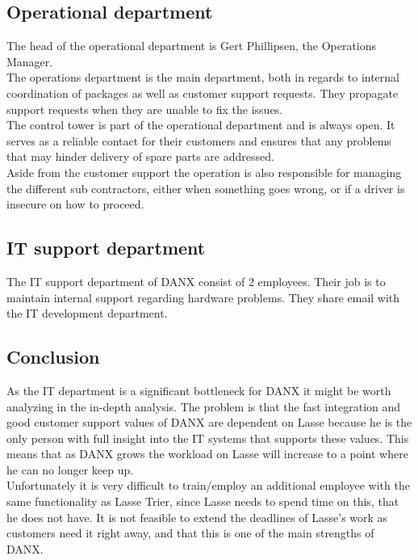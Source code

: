 \subsection{Operational department}
The head of the operational department is Gert Phillipsen, the Operations Manager.\\
The operations department is the main department, both in regards to internal coordination of packages as well as customer support requests.\cite{gert004} They propagate support requests when they are unable to fix the issues.\cite{lasse017}\\
The control tower is part of the operational department and is always open. It serves as a reliable contact for their customers and ensures that any problems that may hinder delivery of spare parts are addressed.\cite{gert004}\\
Aside from the customer support the operation is also responsible for managing the different sub contractors, either when something goes wrong, or if a driver is insecure on how to proceed.

\subsection{IT support department}
The IT support department of DANX consist of 2 employees. Their job is to maintain internal support regarding hardware problems. They share email with the IT development department.\cite{lasse003}

\subsection{Conclusion}
As the IT department is a significant bottleneck for DANX it might be worth analyzing in the in-depth analysis. The problem is that the fast integration and good customer support values of DANX are dependent on Lasse because he is the only person with full insight into the IT systems that supports these values.\cite{lasse011} This means that as DANX grows the workload on Lasse will increase to a point where he can no longer keep up.\\
Unfortunately it is very difficult to train/employ an additional employee with the same functionality as Lasse Trier, since Lasse needs to spend time on this, that he does not have. It is not feasible to extend the deadlines of Lasse’s work as customers need it right away, and that this is one of the main strengths of DANX.